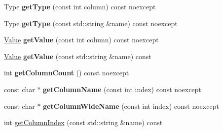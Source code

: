\begin{DoxyCompactItemize}
\item 
\hypertarget{class_s_q_lite_1_1_reader_a0450ea397b1a9d8dd636b82c8757d33e}{Type {\bfseries get\-Type} (const int column) const noexcept}\label{class_s_q_lite_1_1_reader_a0450ea397b1a9d8dd636b82c8757d33e}

\item 
\hypertarget{class_s_q_lite_1_1_reader_ae4f049a45c69b9e1bf6db4cf63699f64}{Type {\bfseries get\-Type} (const std\-::string \&name) const noexcept}\label{class_s_q_lite_1_1_reader_ae4f049a45c69b9e1bf6db4cf63699f64}

\item 
\hypertarget{class_s_q_lite_1_1_reader_a41fcbc5da6eb3fe6fc75e4faed208fc6}{\hyperlink{class_s_q_lite_1_1_value}{Value} {\bfseries get\-Value} (const int column) const noexcept}\label{class_s_q_lite_1_1_reader_a41fcbc5da6eb3fe6fc75e4faed208fc6}

\item 
\hypertarget{class_s_q_lite_1_1_reader_ad352a7124ee46d756462c8a1b014599a}{\hyperlink{class_s_q_lite_1_1_value}{Value} {\bfseries get\-Value} (const std\-::string \&name) const }\label{class_s_q_lite_1_1_reader_ad352a7124ee46d756462c8a1b014599a}

\item 
\hypertarget{class_s_q_lite_1_1_reader_a9e6b9d0d99dea8964a34a3c2f08e99bc}{int {\bfseries get\-Column\-Count} () const noexcept}\label{class_s_q_lite_1_1_reader_a9e6b9d0d99dea8964a34a3c2f08e99bc}

\item 
\hypertarget{class_s_q_lite_1_1_reader_a5004961d65336631d45de411ffb87cd5}{const char $\ast$ {\bfseries get\-Column\-Name} (const int index) const noexcept}\label{class_s_q_lite_1_1_reader_a5004961d65336631d45de411ffb87cd5}

\item 
\hypertarget{class_s_q_lite_1_1_reader_a3b220314921864971914abe137e58013}{const char $\ast$ {\bfseries get\-Column\-Wide\-Name} (const int index) const noexcept}\label{class_s_q_lite_1_1_reader_a3b220314921864971914abe137e58013}

\item 
int \hyperlink{class_s_q_lite_1_1_reader_ae7eaa050a97cda893e9737bca416f0cb}{get\-Column\-Index} (const std\-::string \&name) const 
\end{DoxyCompactItemize}


